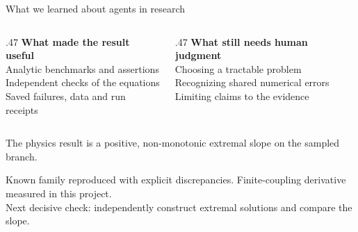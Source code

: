 \documentclass[20pt,aspectratio=169]{beamer}
\newcommand{\smallnote}[1]{{\fontsize{14}{17}\selectfont\color{muted}#1\par}}
\newcommand{\key}[1]{{\color{accent}\bfseries #1}}
\begin{document}
\begin{frame}{What we learned about agents in research}
\begin{columns}[T,onlytextwidth]
\begin{column}{.47\textwidth}
\key{What made the result useful}\\[6mm]Analytic benchmarks and assertions\\[6mm]Independent checks of the equations\\[6mm]Saved failures, data and run receipts
\end{column}
\begin{column}{.47\textwidth}
\key{What still needs human judgment}\\[6mm]Choosing a tractable problem\\[6mm]Recognizing shared numerical errors\\[6mm]Limiting claims to the evidence
\end{column}
\end{columns}
\vspace{12mm}
{\fontsize{26}{32}\selectfont The physics result is a positive, non-monotonic extremal slope on the sampled branch.\par}
\vspace{6mm}
\smallnote{Known family reproduced with explicit discrepancies. Finite-coupling derivative measured in this project.\\Next decisive check: independently construct extremal solutions and compare the slope.}
\end{frame}
\end{document}

